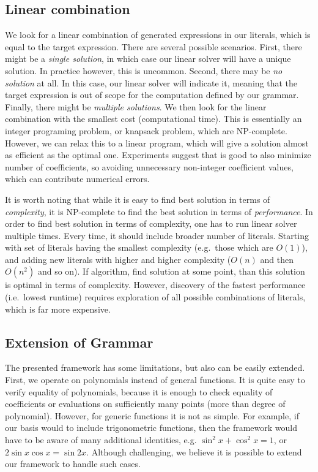 \subsection{Linear combination}
\label{sec:linear}
We look for a linear combination of generated expressions in our
literals, which is equal to the target expression. There are several
possible scenarios. First, there might be a \emph{single solution}, in
which case our linear solver will have a unique solution. In practice
however, this is uncommon. Second, there may be \emph{no solution} at
all.  In this case, our linear solver will indicate it, meaning that
the target expression is out of scope for the computation defined by
our grammar. Finally, there might be \emph{multiple solutions}. We
then look for the linear combination with the smallest cost
(computational time).  This is essentially an integer programing
problem, or knapsack problem, which are NP-complete. However, we can
relax this to a linear program, which will give a solution almost as
efficient as the optimal one.  Experiments suggest that is good to
also minimize number of coefficients, so avoiding unnecessary
non-integer coefficient values, which can contribute numerical errors.



It is worth noting that while it is easy to find best solution in
terms of {\em complexity}, it is NP-complete to find the best solution
in terms of {\em performance}. In order to find best solution in terms
of complexity, one has to run linear solver multiple times. Every
time, it should include broader number of literals. Starting with set
of literals having the smallest complexity (e.g.~those which are
$O(1)$), and adding new literals with higher and higher complexity
($O(n)$ and then $O(n^2)$ and so on). If algorithm, find solution at
some point, than this solution is optimal in terms of
complexity. However, discovery of the fastest performance (i.e.~lowest
runtime) requires exploration of all possible combinations of literals,
which is far more expensive.  


\subsection{Extension of Grammar}
The presented framework has some limitations, but also can be easily extended. First,
we operate on polynomials instead of general functions. It is quite easy to verify
equality of polynomials, because it is enough to check equality of coefficients or
evaluations on sufficiently many points (more than degree of
polynomial). However, for generic functions
it is not as simple. For example, if our basis would to include trigonometric functions, then the
framework would have to be aware of many additional identities,
e.g. $\sin^2{x} + \cos^2{x} = 1$, or $2\sin x \cos x = \sin
2x$. Although challenging, we believe it is possible to extend our
framework to handle such cases. 


